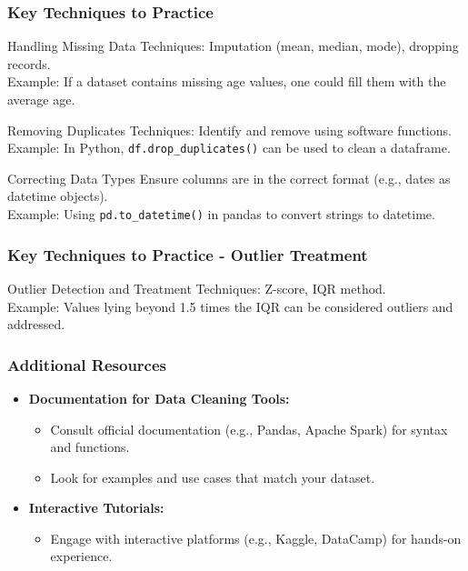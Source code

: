 \documentclass[aspectratio=169]{beamer}
\begin{document}
\begin{frame}[fragile]
    \frametitle{Key Techniques to Practice}
    \begin{block}{Handling Missing Data}
        Techniques: Imputation (mean, median, mode), dropping records. \\
        Example: If a dataset contains missing age values, one could fill them with the average age.
    \end{block}
    \begin{block}{Removing Duplicates}
        Techniques: Identify and remove using software functions. \\
        Example: In Python, \texttt{df.drop\_duplicates()} can be used to clean a dataframe.
    \end{block}
    \begin{block}{Correcting Data Types}
        Ensure columns are in the correct format (e.g., dates as datetime objects). \\
        Example: Using \texttt{pd.to\_datetime()} in pandas to convert strings to datetime.
    \end{block}
\end{frame}

\begin{frame}[fragile]
    \frametitle{Key Techniques to Practice - Outlier Treatment}
    \begin{block}{Outlier Detection and Treatment}
        Techniques: Z-score, IQR method. \\
        Example: Values lying beyond 1.5 times the IQR can be considered outliers and addressed.
    \end{block}
\end{frame}

\begin{frame}[fragile]
    \frametitle{Additional Resources}
    \begin{itemize}
        \item \textbf{Documentation for Data Cleaning Tools:}
            \begin{itemize}
                \item Consult official documentation (e.g., Pandas, Apache Spark) for syntax and functions.
                \item Look for examples and use cases that match your dataset.
            \end{itemize}
        \item \textbf{Interactive Tutorials:}
            \begin{itemize}
                \item Engage with interactive platforms (e.g., Kaggle, DataCamp) for hands-on experience.
            \end{itemize}
    \end{itemize}
\end{frame}
\end{document}

